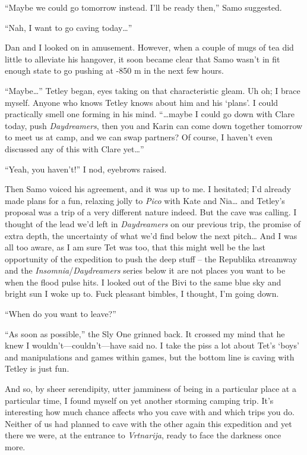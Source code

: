 ``Maybe we could go tomorrow instead. I'll be ready then,'' Samo
suggested.

``Nah, I want to go caving today\ldots{}''

Dan and I looked on in amusement. However, when a couple of mugs of tea
did little to alleviate his hangover, it soon became clear that Samo
wasn't in fit enough state to go pushing at -850 m in the next few
hours.

``Maybe\ldots{}'' Tetley began, eyes taking on that characteristic
gleam. Uh oh; I brace myself. Anyone who knows Tetley knows about him
and his `plans'. I could practically smell one forming in his mind.
``\ldots{}maybe I could go down with Clare today, push
\emph{Daydreamers}, then you and Karin can come down together tomorrow
to meet us at camp, and we can swap partners? Of course, I haven't even
discussed any of this with Clare yet\ldots{}''

``Yeah, you haven't!'' I nod, eyebrows raised.

Then Samo voiced his agreement, and it was up to me. I hesitated; I'd
already made plans for a fun, relaxing jolly to \emph{Pico} with Kate
and Nia\ldots{} and Tetley's proposal was a trip of a very different
nature indeed. But the cave was calling. I thought of the lead we'd left
in \emph{Daydreamers} on our previous trip, the promise of extra depth,
the uncertainty of what we'd find below the next pitch\ldots{} And I was
all too aware, as I am sure Tet was too, that this might well be the
last opportunity of the expedition to push the deep stuff -- the
Republika streamway and the \emph{Insomnia}/\emph{Daydreamers} series
below it are not places you want to be when the flood pulse hits. I
looked out of the Bivi to the same blue sky and bright sun I woke up to.
Fuck pleasant bimbles, I thought, I'm going down.

``When do you want to leave?''

``As soon as possible,'' the Sly One grinned back. It crossed my mind
that he knew I wouldn't---couldn't---have said no. I take the piss a lot
about Tet's `boys' and manipulations and games within games, but the
bottom line is caving with Tetley is just fun.

And so, by sheer serendipity, utter jamminess of being in a particular
place at a particular time, I found myself on yet another storming
camping trip. It's interesting how much chance affects who you cave with
and which trips you do. Neither of us had planned to cave with the other
again this expedition and yet there we were, at the entrance to
\emph{Vrtnarija}, ready to face the darkness once more.

